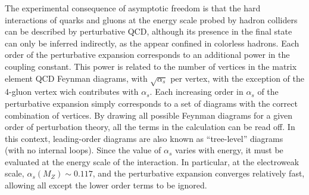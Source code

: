 The experimental consequence of asymptotic freedom is that the hard interactions of quarks and gluons at the energy scale probed by hadron colliders can be described by perturbative QCD, although its presence in the final state can only be inferred indirectly, as the appear confined in colorless hadrons.
Each order of the perturbative expansion corresponds to an additional power in the coupling constant. This power is related to the number of vertices in the matrix element QCD Feynman diagrams, %
with $\sqrt{\alpha_s}$ per vertex, with the exception of the 4-gluon vertex wich contributes with $\alpha_s$. Each increasing order in $\alpha_s$ of the perturbative expansion simply corresponds to a set of diagrams with the correct combination of vertices.  By drawing all possible Feynman diagrams for a given order of perturbation theory, all the terms in the calculation can be read off. In this context, leading-order diagrams are also known as ``tree-level'' diagrams (with no internal loops). 
 Since the value of $\alpha_s$ varies with energy, it must be evaluated at the energy scale of the interaction. In particular, at the electroweak scale, $\alpha_s(M_Z)\sim 0.117$, and the perturbative expansion converges relatively fast, allowing all except the lower order terms to be ignored.
%
